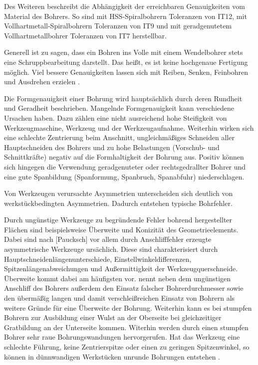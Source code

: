 Des Weiteren beschreibt \cite{Schonherr.2002} die Abhängigkeit der erreichbaren Genauigkeiten vom Material des Bohrers. So sind mit HSS-Spiralbohrern Toleranzen von IT12, mit Vollhartmetall-Spiralbohrern Toleranzen von IT9 und mit geradgenutetem Vollhartmetallbohrer Toleranzen von IT7 herstellbar. 

Generell ist zu sagen, dass ein Bohren ins Volle mit einem Wendelbohrer stets eine Schruppbearbeitung darstellt. Das heißt, es ist keine hochgenaue Fertigung möglich. Viel bessere Genauigkeiten lassen sich mit Reiben, Senken, Feinbohren und Ausdrehen erzielen \cite{Schonherr.2002}.

Die Formgenauigkeit einer Bohrung wird hauptsächlich durch deren Rundheit und Geradheit beschrieben. Mangelnde Formgenauigkeit kann verschiedene Ursachen haben. Dazu zählen eine nicht ausreichend hohe Steifigkeit von Werkzeugmaschine, Werkzeug und der Werkzeugaufnahme. Weiterhin wirken sich eine schlechte Zentrierung beim Anschnitt, ungleichmäßiges Schneiden aller Hauptschneiden des Bohrers und zu hohe Belastungen (Vorschub- und Schnittkräfte) negativ auf die Formhaltigkeit der Bohrung aus. Positiv können sich hingegen die Verwendung geradgenuteter oder rechtsgedrallter Bohrer und eine gute Spanbildung (Spanformung, Spanbruch, Spanabfuhr) niederschlagen. 

Von Werkzeugen verursachte Asymmetrien unterscheiden sich deutlich von werkstückbedingten Asymmetrien. Dadurch entstehen typische Bohrfehler.

Durch ungünstige Werkzeuge zu begründende Fehler bohrend hergestellter Flächen sind beispielsweise Überweite und Konizität des Geometrieelements. Dabei sind nach [Paucksch] vor allem durch Anschlifffehler erzeugte asymmetrische Werkzeuge ursächlich. Diese sind charakterisiert durch Hauptschneidenlängenunterschiede, Einstellwinkeldifferenzen, Spitzenlängenabweichungen und Außermittigkeit der Werkzeugquerschneide.
Überweite kommt dabei am häufigsten vor. \cite{Winkler.1990} nennt neben dem ungünstigen Anschliff des Bohrers außerdem den Einsatz falscher Bohrerdurchmesser sowie den übermäßig langen und damit verschleißreichen Einsatz von Bohrern als weitere Gründe für eine Überweite der Bohrung. 
Weiterhin kann es bei stumpfen Bohrern zur Ausbildung einer Wulst an der Oberseite bei gleichzeitiger Gratbildung an der Unterseite kommen. Witerhin werden durch einen stumpfen Bohrer sehr raue Bohrungswandungen hervorgerufen. 
Hat das Werkzeug eine schlechte Führung, keine Zentrierspitze oder einen zu geringen Spitzenwinkel, so können in dünnwandigen Werkstücken unrunde Bohrungen entstehen \cite{Dietrich.2014}.


